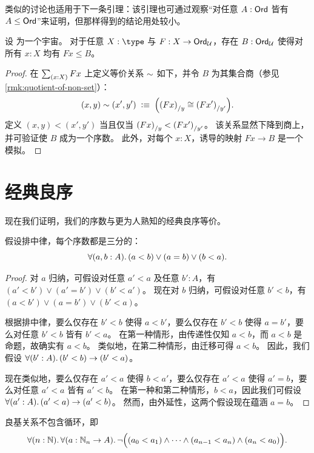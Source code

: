 类似的讨论也适用于下一条引理：该引理也可通过观察``对任意 $A:\mathsf{Ord}$ 皆有 $A\le \mathsf{Ord}$''来证明，但那样得到的结论用处较小。

\begin{lem}\label{thm:ordunion}
  设 \bbU 为一个宇宙。
  对于任意 $X:\type$ 与 $F:X\to \mathsf{Ord}_{\mathcal{U}}$，存在 $B:\mathsf{Ord}_{\mathcal{U}}$ 使得对所有 $x:X$ 均有 $Fx\le B$。
\end{lem}

\begin{proof}
  在 $\sm{x:X} Fx$ 上定义等价关系 $\sim$ 如下，并令 $B$ 为其集合商（参见 \cref{rmk:quotient-of-non-set}）：
  \[ (x,y) \sim (x',y')
  \;\vcentcolon\equiv\;
  \Big({(Fx)}_{/y} \cong {(Fx')}_{/y'}\Big).
  \]
  定义 $(x,y)<(x',y')$ 当且仅当 ${(Fx)}_{/y} < {(Fx')}_{/y'}$。
  该关系显然下降到商上，并可验证使 $B$ 成为一个序数。
  此外，对每个 $x:X$，诱导的映射 $Fx\to B$ 是一个模拟。
\end{proof}

\section{经典良序}
\label{sec:wellorderings}

%
现在我们证明，我们的序数与更为人熟知的经典良序等价。

\begin{lem}
  假设排中律，每个序数都是三分的：
  \[ \fall{a,b:A} (a<b) \vee (a=b) \vee (b<a). \]
\end{lem}

\begin{proof}
  对 $a$ 归纳，可假设对任意 $a'<a$ 及任意 $b':A$，有 $(a'<b') \vee (a'=b') \vee (b'<a')$。
  现在对 $b$ 归纳，可假设对任意 $b'<b$，有 $(a<b') \vee (a=b') \vee (b'<a)$。

  根据排中律，要么仅存在 $b'<b$ 使得 $a<b'$，要么仅存在 $b'<b$ 使得 $a=b'$，要么对任意 $b'<b$ 皆有 $b'<a$。
  在第一种情形，由传递性仅知 $a<b$，而 $a<b$ 是命题，故确实有 $a<b$。
  类似地，在第二种情形，由迁移可得 $a<b$。
  因此，我们假设 $\fall{b':A}(b'<b)\to (b'<a)$。

  现在类似地，要么仅存在 $a'<a$ 使得 $b<a'$，要么仅存在 $a'<a$ 使得 $a'=b$，要么对任意 $a'<a$ 皆有 $a'<b$。
  在第一种和第二种情形，$b<a$，因此我们可假设 $\fall{a':A}(a'<a)\to (a'<b)$。
  然而，由外延性，这两个假设现在蕴涵 $a=b$。
\end{proof}

\begin{lem}
  良基关系不包含循环，即
  \[ \fall{n:\mathbb{N}}{a:\mathbb{N}_n\to A} \neg\Big((a_0<a_1) \wedge \dots \wedge (a_{n-1}<a_n)\wedge (a_n<a_0)\Big). \]
\end{lem}

